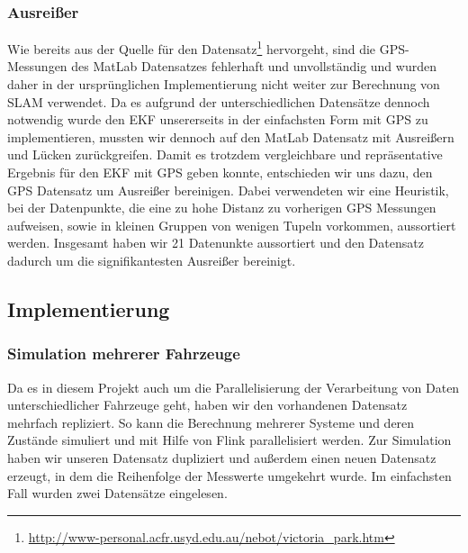 \documentclass[11pt]{article}
\begin{document}
\subsubsection{Ausreißer}
Wie bereits aus der Quelle für den Datensatz\footnote{\url{http://www-personal.acfr.usyd.edu.au/nebot/victoria_park.htm}} hervorgeht, sind die GPS-Messungen des MatLab Datensatzes fehlerhaft und unvollständig und wurden daher in der ursprünglichen Implementierung nicht weiter zur Berechnung von SLAM verwendet. Da es aufgrund der unterschiedlichen Datensätze dennoch notwendig wurde den EKF unsererseits in der einfachsten Form mit GPS zu implementieren, mussten wir dennoch auf den MatLab Datensatz mit Ausreißern und Lücken zurückgreifen. Damit es trotzdem vergleichbare und repräsentative Ergebnis für den EKF mit GPS geben konnte, entschieden wir uns dazu, den GPS Datensatz um Ausreißer bereinigen. Dabei verwendeten wir eine Heuristik, bei der Datenpunkte, die eine zu hohe Distanz zu vorherigen GPS Messungen aufweisen, sowie in kleinen Gruppen von wenigen Tupeln vorkommen, aussortiert werden. Insgesamt haben wir 21 Datenunkte aussortiert und den Datensatz dadurch um die signifikantesten Ausreißer bereinigt. 


\subsection{Implementierung}\label{Implementierung}



\subsubsection{Simulation mehrerer Fahrzeuge}
Da es in diesem Projekt auch um die Parallelisierung der Verarbeitung von Daten unterschiedlicher Fahrzeuge geht, haben wir den vorhandenen Datensatz mehrfach repliziert. So kann die Berechnung mehrerer Systeme und deren Zustände simuliert und mit Hilfe von Flink parallelisiert werden. Zur Simulation haben wir unseren Datensatz dupliziert und außerdem einen neuen Datensatz erzeugt, in dem die Reihenfolge der Messwerte umgekehrt wurde. Im einfachsten Fall wurden zwei Datensätze eingelesen.
\end{document}
